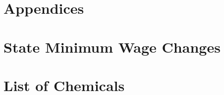 \documentclass[12pt, english]{article}
\begin{document}
    \newpage
    \section*{Appendices}\label{sec:appendices}
    \begin{appendices}
        \renewcommand\thesection{\Roman{section}} %


        \section{State Minimum Wage Changes}\label{sec:state-minimum-wage-changes}
        


        \section{List of Chemicals}\label{sec:list-of-chemicals}
        
    \end{appendices}

\end{document}
